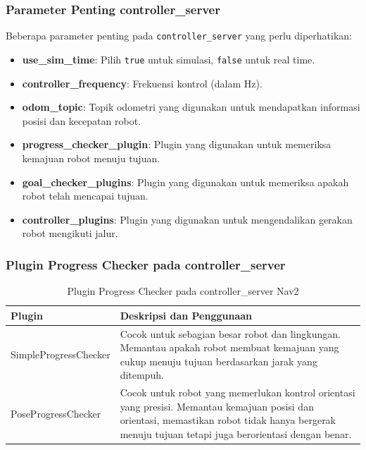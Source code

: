 \documentclass{article}
\begin{document}
\subsubsection*{Parameter Penting controller\_server}

Beberapa parameter penting pada \texttt{controller\_server} yang perlu diperhatikan:
\begin{itemize}
  \item \textbf{use\_sim\_time}: Pilih \texttt{true} untuk simulasi, \texttt{false} untuk real time.
  \item \textbf{controller\_frequency}: Frekuensi kontrol (dalam Hz).
  \item \textbf{odom\_topic}: Topik odometri yang digunakan untuk mendapatkan informasi posisi dan kecepatan robot.
  \item \textbf{progress\_checker\_plugin}: Plugin yang digunakan untuk memeriksa kemajuan robot menuju tujuan.
  \item \textbf{goal\_checker\_plugins}: Plugin yang digunakan untuk memeriksa apakah robot telah mencapai tujuan.
  \item \textbf{controller\_plugins}: Plugin yang digunakan untuk mengendalikan gerakan robot mengikuti jalur.
\end{itemize}

\subsubsection*{Plugin Progress Checker pada controller\_server}
\begin{table}[H]
  \centering
  \renewcommand{\arraystretch}{1.2}
  \begin{tabular}{|p{4cm}|p{7cm}|}
    \hline
    \textbf{Plugin}       & \textbf{Deskripsi dan Penggunaan}                                                                                                                                                                    \\
    \hline
    SimpleProgressChecker & Cocok untuk sebagian besar robot dan lingkungan. Memantau apakah robot membuat kemajuan yang cukup menuju tujuan berdasarkan jarak yang ditempuh.                                                    \\
    \hline
    PoseProgressChecker   & Cocok untuk robot yang memerlukan kontrol orientasi yang presisi. Memantau kemajuan posisi dan orientasi, memastikan robot tidak hanya bergerak menuju tujuan tetapi juga berorientasi dengan benar. \\
    \hline
  \end{tabular}
  \caption{Plugin Progress Checker pada controller\_server Nav2}
\end{table}
\end{document}
